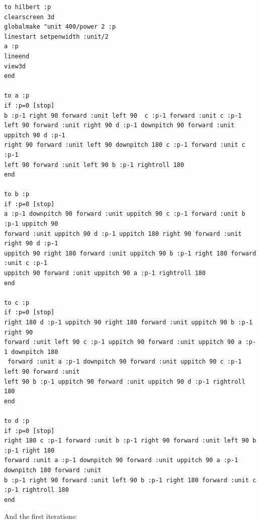 \begin{verbatim}
to hilbert :p
clearscreen 3d
globalmake "unit 400/power 2 :p
linestart setpenwidth :unit/2
a :p
lineend
view3d
end

to a :p
if :p=0 [stop]
b :p-1 right 90 forward :unit left 90  c :p-1 forward :unit c :p-1
left 90 forward :unit right 90 d :p-1 downpitch 90 forward :unit uppitch 90 d :p-1
right 90 forward :unit left 90 downpitch 180 c :p-1 forward :unit c :p-1
left 90 forward :unit left 90 b :p-1 rightroll 180
end

to b :p
if :p=0 [stop]
a :p-1 downpitch 90 forward :unit uppitch 90 c :p-1 forward :unit b :p-1 uppitch 90 
forward :unit uppitch 90 d :p-1 uppitch 180 right 90 forward :unit right 90 d :p-1 
uppitch 90 right 180 forward :unit uppitch 90 b :p-1 right 180 forward :unit c :p-1 
uppitch 90 forward :unit uppitch 90 a :p-1 rightroll 180 
end

to c :p
if :p=0 [stop]
right 180 d :p-1 uppitch 90 right 180 forward :unit uppitch 90 b :p-1 right 90
forward :unit left 90 c :p-1 uppitch 90 forward :unit uppitch 90 a :p-1 downpitch 180
 forward :unit a :p-1 downpitch 90 forward :unit uppitch 90 c :p-1 left 90 forward :unit 
left 90 b :p-1 uppitch 90 forward :unit uppitch 90 d :p-1 rightroll 180 
end

to d :p
if :p=0 [stop]
right 180 c :p-1 forward :unit b :p-1 right 90 forward :unit left 90 b :p-1 right 180
forward :unit a :p-1 downpitch 90 forward :unit uppitch 90 a :p-1 downpitch 180 forward :unit
b :p-1 right 90 forward :unit left 90 b :p-1 right 180 forward :unit c :p-1 rightroll 180
end
\end{verbatim}
And the first iterations:

